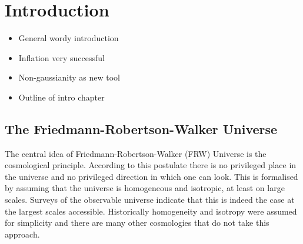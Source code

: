 \renewcommand{\CVSrevision}{\version$Id: mainintro.tex,v 1.17 2009/08/18 18:08:32 ith Exp $}

\chapter{Introduction}
\label{ch:introduction}
\begin{itemize}
 \item General wordy introduction
 \item Inflation very successful
 \item Non-gaussianity as new tool
 \item Outline of intro chapter
\end{itemize}

\section{The Friedmann-Robertson-Walker Universe}
\label{sec:frw-intro}
The central idea of Friedmann-Robertson-Walker (FRW) Universe is the
cosmological principle. According to this postulate there is no privileged
place in the universe and no privileged direction in which one can look. This
is formalised by assuming that the universe is homogeneous and isotropic, at
least on large scales. 
Surveys of the observable universe indicate that this is
indeed the case at the largest scales accessible. Historically homogeneity and
isotropy were assumed for simplicity and there are many
other cosmologies that do not take this approach.


